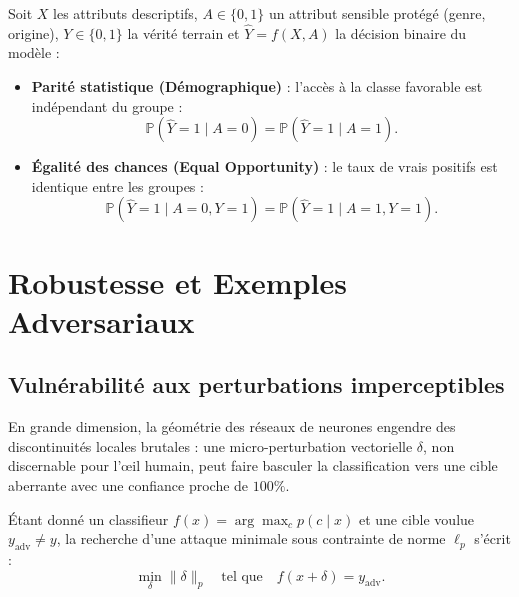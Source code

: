 Soit $X$ les attributs descriptifs, $A \in \{0, 1\}$ un attribut sensible protégé (genre, origine), $Y \in \{0, 1\}$ la vérité terrain et $\hat{Y} = f(X, A)$ la décision binaire du modèle :
\begin{definition}
    \begin{itemize}
        \item \textbf{Parité statistique (Démographique)} : l'accès à la classe favorable est indépendant du groupe :
        \begin{equation}
            \mathbb{P}(\hat{Y} = 1 \mid A = 0) = \mathbb{P}(\hat{Y} = 1 \mid A = 1).
        \end{equation}
        \item \textbf{Égalité des chances (Equal Opportunity)} : le taux de vrais positifs est identique entre les groupes :
        \begin{equation}
            \mathbb{P}(\hat{Y} = 1 \mid A = 0, Y = 1) = \mathbb{P}(\hat{Y} = 1 \mid A = 1, Y = 1).
        \end{equation}
    \end{itemize}
\end{definition}


\section{Robustesse et Exemples Adversariaux}

\subsection{Vulnérabilité aux perturbations imperceptibles}

En grande dimension, la géométrie des réseaux de neurones engendre des discontinuités locales brutales : une micro-perturbation vectorielle $\delta$, non discernable pour l'œil humain, peut faire basculer la classification vers une cible aberrante avec une confiance proche de $100\%$.

\begin{definition}
    Étant donné un classifieur $f(x) = \arg\max_c p(c \mid x)$ et une cible voulue $y_{\mathrm{adv}} \neq y$, la recherche d'une attaque minimale sous contrainte de norme $\ell_p$ s'écrit :
    \begin{equation}
        \min_{\delta} \|\delta\|_p \quad \text{tel que} \quad f(x + \delta) = y_{\mathrm{adv}}.
    \end{equation}
\end{definition}


